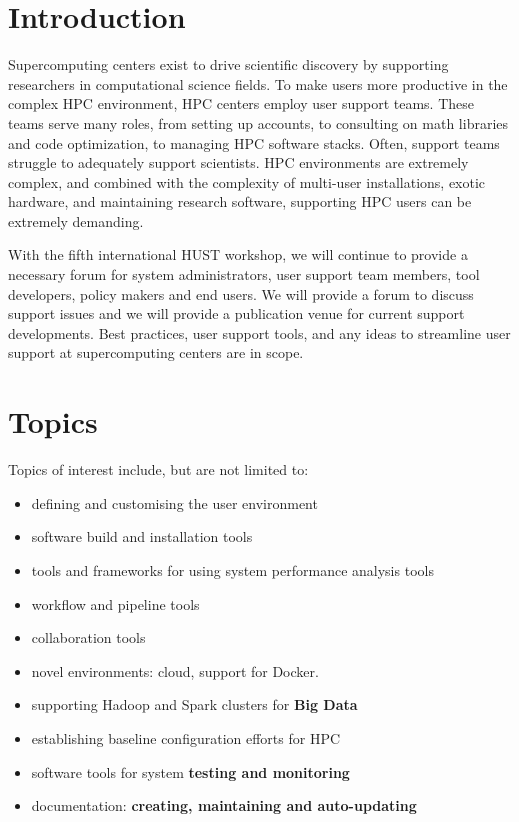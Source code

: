 \documentclass[11pt,a4paper]{article}
\begin{document}
\parindent 0pt
\parskip 6pt
\pagebreak
\section{Introduction}

Supercomputing centers exist to drive scientific discovery by supporting researchers in 
computational science fields.  To make users more productive in the complex HPC
environment, HPC centers employ user support teams.  These teams
serve many roles, from setting up accounts, to consulting on math libraries and code
optimization, to managing HPC software stacks.
Often, support teams struggle to adequately support scientists.
HPC environments are extremely complex, and combined with
the complexity of multi-user installations, exotic hardware, and maintaining
research software, supporting HPC users can be extremely demanding.


With the fifth international HUST workshop, we will continue to provide a necessary forum for 
system administrators, user support team members, tool developers, policy makers and
end users.  We will provide a forum to discuss support issues and we will
provide a publication venue for current support developments.  Best practices,
user support tools, and any ideas to streamline user support at supercomputing
centers are in scope.

\section{Topics}

Topics of interest include, but are not limited to:

\begin{itemize}
\item defining and customising the user environment
\item software build and installation tools
\item tools and frameworks for using system performance analysis tools
\item workflow and pipeline tools
\item collaboration tools
\item novel environments: cloud, support for Docker.
\item supporting Hadoop and Spark clusters for {\bf Big Data}
\item establishing baseline configuration efforts for HPC
\item software tools for system {\bf testing and monitoring}
\item documentation: {\bf creating, maintaining and auto-updating}
\end{itemize}
\end{document}
